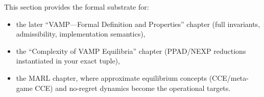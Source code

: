 This section provides the formal substrate for:
\begin{itemize}
\item the later ``VAMP---Formal Definition and Properties'' chapter (full invariants, admissibility, implementation semantics),
\item the ``Complexity of VAMP Equilibria'' chapter (PPAD/NEXP reductions instantiated in your exact tuple),
\item the MARL chapter, where approximate equilibrium concepts (CCE/meta-game CCE) and no-regret dynamics become the operational targets.
\end{itemize}
